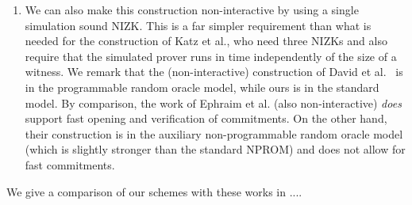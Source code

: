 \begin{enumerate}
\item{} We can also make this construction non-interactive by using a single simulation sound NIZK. This is a far simpler requirement than what is needed for the construction of Katz et al., who need three NIZKs and also require that the simulated prover runs in time independently of the size of a witness. We remark that the (non-interactive) construction of David et al.~\cite{EC:BDDNO21} is in the programmable random oracle model, while ours is in the standard model. By comparison, the work of Ephraim et al. \cite{EPRINT:EFKP20a} (also non-interactive) \emph{does} support fast opening and verification of commitments. On the other hand, their construction is in the auxiliary non-programmable random oracle model (which is slightly stronger than the standard NPROM) and does not allow for fast commitments.
\end{enumerate}

We give a comparison of our schemes with these works in ....



